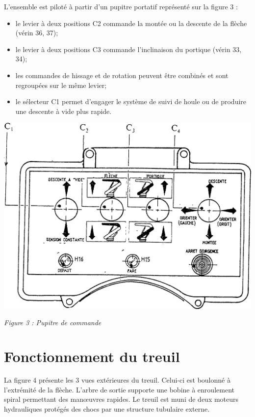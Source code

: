 \documentclass[10pt]{article}
\begin{document}
\begin{minipage}[c]{.49\linewidth}

L'ensemble est piloté à partir d'un pupitre portatif représenté sur la figure 3 :
\begin{itemize}
\item le levier à deux positions C2 commande la montée ou la descente de la flèche (vérin 36, 37);
\item le levier à deux positions C3 commande l'inclinaison du portique (vérin 33, 34);
\item les commandes de hissage et de rotation peuvent être combinés et sont regroupées sur le même levier;
\item le sélecteur C1 permet d'engager le système de suivi de houle ou de produire une descente à vide plus rapide.
\end{itemize}

\end{minipage} \hfill
\begin{minipage}[c]{.49\linewidth}
\begin{center}
\includegraphics[width=.95\textwidth]{images/Pupitre}

\textit{Figure 3 : Pupitre de commande}
\end{center}
\end{minipage} 

\section{Fonctionnement du treuil}
La figure 4 présente les 3 vues extérieures du treuil. Celui-ci est boulonné à l'extrémité de la flèche. L'arbre de sortie supporte une bobine à enroulement spiral permettant des man\oe{}uvres rapides. Le treuil est muni de deux moteurs hydrauliques protégés des chocs par une structure tubulaire externe. 
\end{document}

